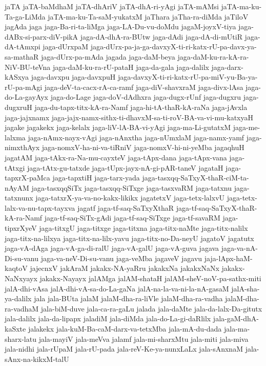 {jaTA
jaTA-baMdhaM
jaTA-dhAriV
jaTA-dhA-ri-yAgi
jaTA-mAMsi
jaTA-ma-ku-Ta-ga-LiMda
jaTA-ma-ku-Ta-saM-yukatxM
jaThara
jaTha-ra-diMda
jaTiloV
jagAda
jaga
jaga-Ba-ri-ta-liMga
jaga-LA-Du-vu-doMdu
jagaM-joyxV-tiya
jaga-dABx-si-parx-diV-pikA
jaga-dA-dhA-ra-BUtw
jaga-dAdi
jaga-dA-di-mUtiR
jaga-dA-tAmxpi
jaga-dUrxpaM
jaga-dUrx-pa-ja-ga-davxyX-ti-ri-katx-rU-pa-davx-ya-sa-mathaR
jaga-dUrx-pa-mAda
jagada
jaga-daM-beya
jaga-daM-ku-ra-kA-ra-NiV-BU-teVna
jaga-daM-ku-ra-rU-pataH
jaga-da-gala
jaga-dalilx
jaga-darx-kASxya
jaga-davxpu
jaga-davxpuH
jaga-davxyX-ti-ri-katx-rU-pa-miV-yu-Ba-ya-rU-pa-mAgi
jaga-deV-ta-cacx-rA-ca-ramf
jaga-diV-shavxraM
jaga-divx-lAsa
jaga-do-La-gayAyx
jaga-do-Lage
jaga-doV-dAdhxra
jaga-dugx-rUnf
jaga-dugxru
jaga-dugxruH
jaga-du-tapx-titx-kA-ra-Namf
jaga-hi-tA-thaR-kA-raNa
jaga-jAvxla
jaga-jajxnamx
jaga-jajx-namx-sithx-ti-dhavxM-sa-ti-roV-BA-va-vi-mu-katxyaH
jagake
jagakekx
jaga-kelalx
jaga-liV-lA-BA-vi-yAgi
jaga-ma-Li-gutatxM
jaga-me-lalxma
jaga-nAmx-nayx-vAgi
jaga-nAnxtha
jaga-nUmxlaM
jaga-namx-yamf
jaga-nimxthAyx
jaga-nomxV-ha-ni-va-tiRniV
jaga-nomxV-hi-ni-yeMba
jagaqhuH
jagatAM
jaga-tAkx-ra-Na-mu-cayxteV
jaga-tApx-dana
jaga-tApx-vana
jaga-tAtxgi
jaga-tAtx-gu-tatxde
jaga-tUpx-jayx-nA-gi-pAR-taneV
jagataH
jaga-tapxrX-paMca
jaga-tapxtiH
jaga-tarx-yada
jaga-tasxqq-SaTxyX-thaR-ciM-ta-nAyAM
jaga-tasxqqSiTx
jaga-tasxqq-SiTxge
jaga-tasxvaRM
jaga-tatxnu
jaga-tatxnunx
jaga-tatxrX-ya-va-no-kakx-likikx
jagatetxV
jaga-tetx-lalxvU
jaga-tetx-lalx-va-nu-tapx-tayxva
jagatf
jaga-tf-saq-SaTxyXthaR
jaga-tf-saq-SaTxyX-thaR-kA-ra-Namf
jaga-tf-saq-SiTx-gAdi
jaga-tf-saq-SiTxge
jaga-tf-savaRM
jaga-tipxrXyeV
jaga-titxgU
jaga-titxge
jaga-titxna
jaga-titx-naMte
jaga-titx-nalilx
jaga-titx-na-lilxya
jaga-titx-na-lilx-yavu
jaga-titx-no-Da-neyU
jagatoV
jagatutx
jaga-vA-dAga
jaga-vA-ga-di-ralU
jaga-vA-galU
jaga-vA-guva
jagava
jaga-va-nA-Di-su-vanu
jaga-va-neV-Di-su-vanu
jaga-veMba
jagaveV
jagavu
jaja-lApx-haM-kaqtoV
jajecnxV
jakAraM
jakakx-NA-yaRru
jakakxNa
jakakxNaNx
jakakx-NaNxyayx
jakakx-Nayayx
jalAMga
jalAM-shataH
jalAM-sheV-noV-pa-sathx-miti
jalA-dhi-vAsa
jalA-dhi-vA-sa-do-La-gaNa
jalA-na-la-va-ni-la-nA-gasaM
jalA-sha-ya-dalilx
jala
jala-BUta
jalaM
jalaM-dha-ra-liVle
jalaM-dha-ra-vadha
jalaM-dha-ra-vadhaM
jala-biM-duve
jala-ca-ra-gaLu
jalada
jala-daMte
jala-da-lalx-Da-gitutx
jala-dalilx
jala-da-lipapx
jaladiM
jala-diMda
jala-do-La-gi-daRlilx
jala-gaM-dhA-kaSxte
jalakekx
jala-kuM-Ba-caM-darx-va-tetxMba
jala-mA-du-dada
jala-ma-sharx-latu
jala-mayiV
jala-meVva
jalamf
jala-mi-sharxMtu
jala-miti
jala-miva
jala-nidhi
jala-rUpaM
jala-rU-pada
jala-reV-Ke-ya-nunxLaLx
jala-sAnxnaM
jala-sAnx-na-kikxM-talU
}
